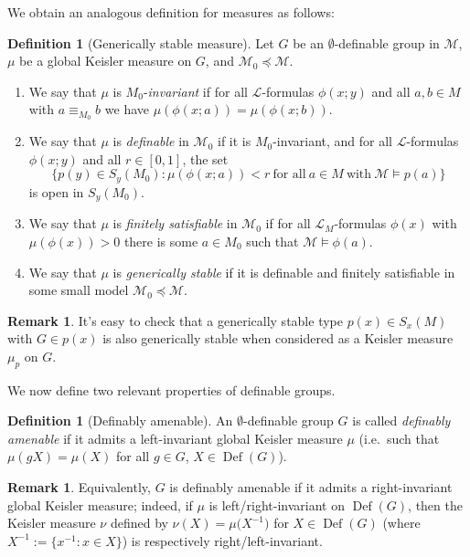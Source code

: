 \documentclass[a4paper]{report}
\newcommand{\ind}{\hspace{15pt}}
\renewcommand{\L}{\mathcal{L}}
\newcommand{\M}{\mathcal{M}}
\DeclareMathOperator{\Def}{Def}
\theoremstyle{definition}
\newtheorem{defn}[thm]{Definition}
\theoremstyle{remstyle}
\newtheorem{rem}[thm]{Remark}
\begin{document}
We obtain an analogous definition for measures as follows:

\begin{defn}[Generically stable measure] Let $G$ be an $\emptyset$-definable group in $\M$, $\mu$ be a global Keisler measure on $G$, and $\M_0\preceq \M$.
	\begin{enumerate}
		\item We say that $\mu$ is $M_0$-\emph{invariant} if for all $\L$-formulas $\phi(x;y)$ and all $a,b\in M$ with $a\equiv_{M_0} b$ we have $\mu(\phi(x;a))=\mu(\phi(x;b))$.
		\item We say that $\mu$ is \emph{definable} in $\M_0$ if it is $M_0$-invariant, and for all $\L$-formulas $\phi(x;y)$ and all $r\in[0,1]$, the set
		      \begin{equation*}
			      \big\{p(y)\in S_y(M_0):\mu(\phi(x;a))<r\ \text{for all}\ a\in M\ \text{with}\ \M\models p(a)\big\}
		      \end{equation*}
		      is open in $S_y(M_0)$.
		\item We say that $\mu$ is \emph{finitely satisfiable} in $\M_0$ if for all $\L_M$-formulas $\phi(x)$ with $\mu(\phi(x))>0$ there is some $a\in M_0$ such that $\M\models \phi(a)$.
		\item We say that $\mu$ is \emph{generically stable} if it is definable and finitely satisfiable in some small model $\M_0\preceq\M$.
	\end{enumerate}
\end{defn}

\begin{rem}
	It's easy to check that a generically stable type $p(x)\in S_x(M)$ with $G\in p(x)$ is also generically stable when considered as a Keisler measure $\mu_p$ on $G$.
\end{rem}

\ind We now define two relevant properties of definable groups.

\begin{defn}[Definably amenable]
	An $\emptyset$-definable group $G$ is called \emph{definably amenable} if it admits a left-invariant global Keisler measure $\mu$ (i.e.\ such that $\mu(gX)=\mu(X)$ for all $g\in G$, $X\in\Def(G)$).
\end{defn}

\begin{rem}
	Equivalently, $G$ is definably amenable if it admits a right-invariant global Keisler measure; indeed, if $\mu$ is left/right-invariant on $\Def(G)$, then the Keisler measure $\nu$ defined by $\nu(X) = \mu\big(X^{-1}\big)$ for $X\in\Def(G)$ (where $X^{-1}:=\{x^{-1}:x\in X\}$) is respectively right/left-invariant.
\end{rem}
\end{document}

